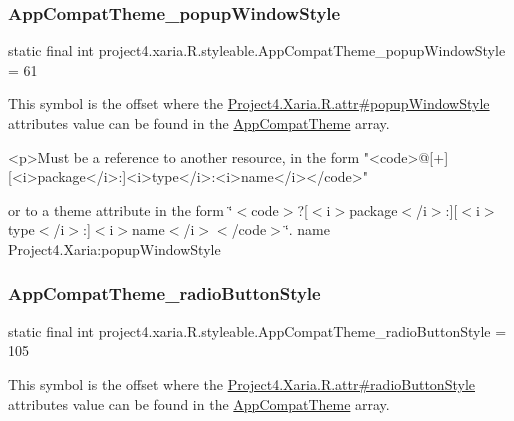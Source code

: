 \subsubsection{\texorpdfstring{App\+Compat\+Theme\+\_\+popup\+Window\+Style}{AppCompatTheme\_popupWindowStyle}}
{\footnotesize\ttfamily static final int project4.\+xaria.\+R.\+styleable.\+App\+Compat\+Theme\+\_\+popup\+Window\+Style = 61\hspace{0.3cm}{\ttfamily [static]}}

This symbol is the offset where the \hyperlink{}{Project4.\+Xaria.\+R.\+attr\#popup\+Window\+Style} attribute\textquotesingle{}s value can be found in the \hyperlink{classproject4_1_1xaria_1_1R_1_1styleable_aad8bec413e2350f9404e6ff0e831a85d}{App\+Compat\+Theme} array.

\begin{DoxyVerb}      <p>Must be a reference to another resource, in the form "<code>@[+][<i>package</i>:]<i>type</i>:<i>name</i></code>"
\end{DoxyVerb}
 or to a theme attribute in the form \char`\"{}$<$code$>$?\mbox{[}$<$i$>$package$<$/i$>$\+:\mbox{]}\mbox{[}$<$i$>$type$<$/i$>$\+:\mbox{]}$<$i$>$name$<$/i$>$$<$/code$>$\char`\"{}.  name Project4.\+Xaria\+:popup\+Window\+Style \mbox{\label{classproject4_1_1xaria_1_1R_1_1styleable_a76cf668ccbb7d7b487042d61c9b4a2e1}} 
\subsubsection{\texorpdfstring{App\+Compat\+Theme\+\_\+radio\+Button\+Style}{AppCompatTheme\_radioButtonStyle}}
{\footnotesize\ttfamily static final int project4.\+xaria.\+R.\+styleable.\+App\+Compat\+Theme\+\_\+radio\+Button\+Style = 105\hspace{0.3cm}{\ttfamily [static]}}

This symbol is the offset where the \hyperlink{}{Project4.\+Xaria.\+R.\+attr\#radio\+Button\+Style} attribute\textquotesingle{}s value can be found in the \hyperlink{classproject4_1_1xaria_1_1R_1_1styleable_aad8bec413e2350f9404e6ff0e831a85d}{App\+Compat\+Theme} array.

